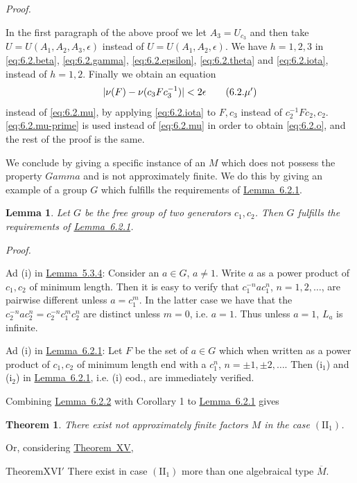 \documentclass[b5paper,twoside]{article}
\newcommand{\thmref}[2]{\hyperref[#1]{\mbox{Theorem~#2}}}
\newcommand{\lemref}[2]{\hyperref[#1]{\mbox{Lemma~#2}}}
\theoremstyle{mvnplain}
\newtheorem{theorem}{Theorem}
\newtheorem{lemma}{Lemma}[section]
\renewenvironment{proof}[1][Proof]{%
  \par\addvspace{0.35\baselineskip}%
  \noindent\textit{#1.}\ \normalfont\ignorespaces
}{%
  \par\addvspace{0.35\baselineskip}%
}
\newcommand{\M}{\mathbf M}
\def\M{M}%
\def\Gamma{Gamma}%
\def\mathfrak#1{#1}%
\begin{document}
\begin{proof}
In the first paragraph of the above proof we let $A_3=U_{c_3}$ and then take
$U=U(A_1,A_2,A_3,\epsilon)$ instead of $U=U(A_1,A_2,\epsilon)$. We have
$h=1,2,3$ in \eqref{eq:6.2.beta}, \eqref{eq:6.2.gamma},
\eqref{eq:6.2.epsilon}, \eqref{eq:6.2.theta} and \eqref{eq:6.2.iota}, instead
of $h=1,2$. Finally we obtain an equation
\begin{equation}
  |\nu(\mathfrak F)-\nu(c_3\mathfrak F c_3^{-1})|<2\epsilon
  \tag{6.2.\ensuremath{\mu'}}\label{eq:6.2.mu-prime}
\end{equation}
instead of \eqref{eq:6.2.mu}, by applying \eqref{eq:6.2.iota} to
$\mathfrak F,c_3$ instead of $c_2^{-1}\mathfrak F c_2,c_2$.
\eqref{eq:6.2.mu-prime} is used instead of \eqref{eq:6.2.mu} in order to
obtain \eqref{eq:6.2.o}, and the rest of the proof is the same.
\end{proof}

We conclude by giving a specific instance of an $\M$ which does not possess
the property $\Gamma$ and is not approximately finite. We do this by giving
an example of a group $\mathfrak G$ which fulfills the requirements of
\lemref{lem:6.2.1}{6.2.1}.

\begin{lemma}\label{lem:6.2.2}
Let $\mathfrak G$ be the free group of two generators $c_1,c_2$. Then
$\mathfrak G$ fulfills the requirements of \lemref{lem:6.2.1}{6.2.1}.
\end{lemma}

\begin{proof}
Ad (i) in \lemref{lem:5.3.4}{5.3.4}: Consider an $a\in\mathfrak G$,
$a\ne1$. Write $a$ as a power product of $c_1,c_2$ of minimum length. Then
it is easy to verify that $c_1^{-n}ac_1^n$, $n=1,2,\ldots$, are pairwise
different unless $a=c_1^m$. In the latter case we have that the
$c_2^{-n}ac_2^n=c_2^{-n}c_1^mc_2^n$ are distinct unless $m=0$, i.e. $a=1$.
Thus unless $a=1$, $\mathfrak L_a$ is infinite.

Ad (i) in \lemref{lem:6.2.1}{6.2.1}: Let $\mathfrak F$ be the set of
$a\in\mathfrak G$ which when written as a power product of $c_1,c_2$ of
minimum length end with a $c_1^n$, $n=\pm1,\pm2,\ldots$. Then (i$_1$) and
(i$_2$) in \lemref{lem:6.2.1}{6.2.1}, i.e. (i) eod., are immediately
verified.
\end{proof}

Combining \lemref{lem:6.2.2}{6.2.2} with Corollary 1 to
\lemref{lem:6.2.1}{6.2.1} gives
\begin{theorem}\label{thm:XVI}
There exist not approximately finite factors $\M$ in the case
$(\mathrm{II}_1)$.
\end{theorem}
Or, considering \thmref{thm:XV}{XV},
\begin{namedstatement}{Theorem}{XVI$'$}\label{thm:XVI-prime}
There exist in case $(\mathrm{II}_1)$ more than one algebraical type
$\overline{\M}$.
\end{namedstatement}
\end{document}
